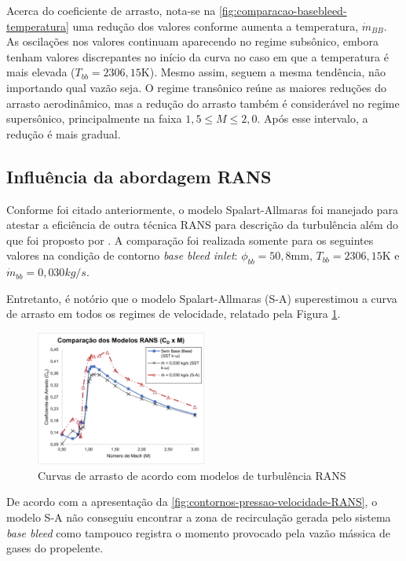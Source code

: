 Acerca do coeficiente de arrasto, nota-se na \autoref{fig:comparacao-basebleed-temperatura} uma redução dos valores conforme aumenta a temperatura, $\Dot{m}_{BB}$. As oscilações nos valores continuam aparecendo no regime subsônico, embora tenham valores discrepantes no início da curva no caso em que a temperatura é mais elevada ($T_{bb} = 2306,15 \unit{\kelvin}$). Mesmo assim, seguem a mesma tendência, não importando qual vazão seja. O regime transônico reúne as maiores reduções do arrasto aerodinâmico, mas a redução do arrasto também é considerável no regime supersônico, principalmente na faixa $1,5 \leq M \leq 2,0$. Após esse intervalo, a redução é mais gradual.

\subsection{Influência da abordagem RANS}\label{subsec:resultados-com-basebleed-RANS}

Conforme foi citado anteriormente, o modelo Spalart-Allmaras \cite{Spalart1992} foi manejado para atestar a eficiência de outra técnica RANS para descrição da turbulência além do que foi proposto por \citeauthor{Menter1994TwoequationET}. A comparação foi realizada somente para os seguintes valores na condição de contorno \textit{base bleed inlet}: $\phi_{bb} = 50,8 \unit{\mm}$, $T_{bb} = 2306,15 \unit{\kelvin}$ e $\Dot{m}_{bb} = 0,030 \si{kg/s}$.

Entretanto, é notório que o modelo Spalart-Allmaras (S-A) superestimou a curva de arrasto em todos os regimes de velocidade, relatado pela Figura \ref{fig:comparacao-bb-rans}.

\begin{figure}[!ht]
    \centering
    \includegraphics[width=0.5\textwidth]{cd-combasebleed-rans.png}
 	\caption{Curvas de arrasto de acordo com modelos de turbulência RANS}
    \label{fig:comparacao-bb-rans}
\end{figure}

De acordo com a apresentação da \autoref{fig:contornos-pressao-velocidade-RANS}, o modelo S-A não conseguiu encontrar a zona de recirculação gerada pelo sistema \textit{base bleed} como tampouco registra o momento provocado pela vazão mássica de gases do propelente.

